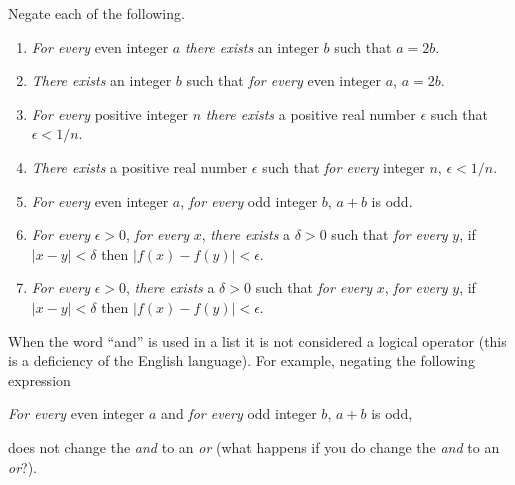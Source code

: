 	\begin{exercise} Negate each of the following.
		\begin{enumerate}
			\item \emph{For every} even integer $a$ \emph{there exists} an integer $b$ such that $a = 2b$.
			\item \emph{There exists} an integer $b$ such that \emph{for every} even integer $a$, $a = 2b$.
			\item \emph{For every} positive integer $n$ \emph{there exists} a positive real number $\epsilon$ such that $ \epsilon < 1/n$.
			\item \emph{There exists} a positive real number $\epsilon$ such that \emph{for every} integer $n$, $ \epsilon < 1/n$.
			\item \emph{For every} even integer $a$, \emph{for every} odd integer $b$, $a + b$ is odd.
			\item {\it For every} $\epsilon > 0$, {\it for every} $x$, {\it there exists} a $\delta > 0$ such that {\it for every} $y$, if $|x-y| < \delta$ then $|f(x) - f(y)| < \epsilon$.
			\item {\it For every} $\epsilon > 0$, {\it there exists} a $\delta > 0$ such that {\it for every} $x$, {\it for every} $y$, if $|x-y| < \delta$ then $|f(x) - f(y)| < \epsilon$.
		\end{enumerate}
	\end{exercise}

	 When the word ``and'' is used in a list it is not considered a logical operator (this is a deficiency of the English language). For example, negating the following expression
	\begin{center}
		\emph{For every} even integer $a$ and \emph{for every} odd integer $b$, $a + b$ is odd,
	\end{center}
	does not change the {\it and} to an {\it or} (what happens if you do change the {\it and} to an {\it or}?).
